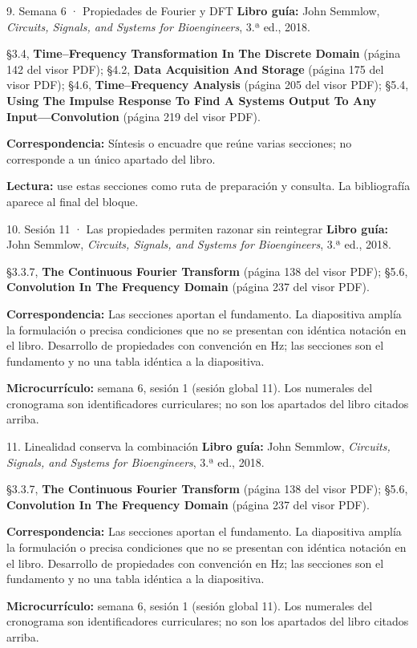 \documentclass[
  10pt,
  ignorenonframetext,
  aspectratio=169,
  spanish,
]{beamer}
\begin{document}
\begin{frame}{9. Semana 6 · Propiedades de Fourier y DFT}
\label{semana-6-propiedades-de-fourier-y-dft}
\textbf{Libro guía:} John Semmlow, \emph{Circuits, Signals, and Systems
for Bioengineers}, 3.ª ed., 2018.

§3.4, \textbf{Time--Frequency Transformation In The Discrete Domain}
(página 142 del visor PDF); §4.2, \textbf{Data Acquisition And Storage}
(página 175 del visor PDF); §4.6, \textbf{Time--Frequency Analysis}
(página 205 del visor PDF); §5.4, \textbf{Using The Impulse Response To
Find A Systems Output To Any Input---Convolution} (página 219 del visor
PDF).

\textbf{Correspondencia:} Síntesis o encuadre que reúne varias
secciones; no corresponde a un único apartado del libro.

\textbf{Lectura:} use estas secciones como ruta de preparación y
consulta. La bibliografía aparece al final del bloque.
\end{frame}

\begin{frame}{10. Sesión 11 · Las propiedades permiten razonar sin
reintegrar}
\label{sesiuxf3n-11-las-propiedades-permiten-razonar-sin-reintegrar}
\textbf{Libro guía:} John Semmlow, \emph{Circuits, Signals, and Systems
for Bioengineers}, 3.ª ed., 2018.

§3.3.7, \textbf{The Continuous Fourier Transform} (página 138 del visor
PDF); §5.6, \textbf{Convolution In The Frequency Domain} (página 237 del
visor PDF).

\textbf{Correspondencia:} Las secciones aportan el fundamento. La
diapositiva amplía la formulación o precisa condiciones que no se
presentan con idéntica notación en el libro. Desarrollo de propiedades
con convención en Hz; las secciones son el fundamento y no una tabla
idéntica a la diapositiva.

\textbf{Microcurrículo:} semana 6, sesión 1 (sesión global 11). Los
numerales del cronograma son identificadores curriculares; no son los
apartados del libro citados arriba.
\end{frame}

\begin{frame}{11. Linealidad conserva la combinación}
\label{linealidad-conserva-la-combinaciuxf3n}
\textbf{Libro guía:} John Semmlow, \emph{Circuits, Signals, and Systems
for Bioengineers}, 3.ª ed., 2018.

§3.3.7, \textbf{The Continuous Fourier Transform} (página 138 del visor
PDF); §5.6, \textbf{Convolution In The Frequency Domain} (página 237 del
visor PDF).

\textbf{Correspondencia:} Las secciones aportan el fundamento. La
diapositiva amplía la formulación o precisa condiciones que no se
presentan con idéntica notación en el libro. Desarrollo de propiedades
con convención en Hz; las secciones son el fundamento y no una tabla
idéntica a la diapositiva.

\textbf{Microcurrículo:} semana 6, sesión 1 (sesión global 11). Los
numerales del cronograma son identificadores curriculares; no son los
apartados del libro citados arriba.
\end{frame}
\end{document}
